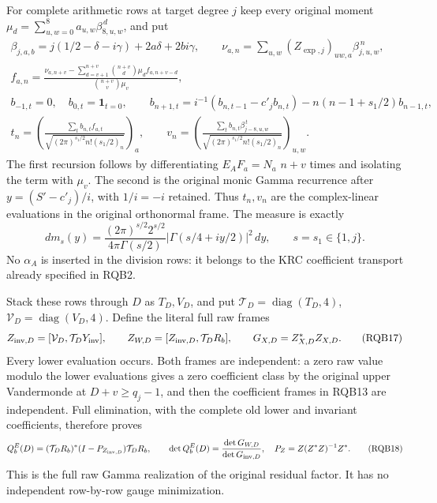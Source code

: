 \documentclass[11pt,a4paper]{article}
\begin{document}
For complete arithmetic rows at target degree $j$ keep every original
moment $\mu_d=\sum_{u,w=0}^8a_{u,w}\beta_{8,u,w}^{\,d}$, and put
\[
\begin{gathered}
 \beta_{j,a,b}=j(1/2-\delta-i\gamma)+2a\delta+2bi\gamma,\qquad
 \nu_{a,n}=\sum_{u,w}(Z_{\exp,j})_{uw,a}\beta_{j,u,w}^{\,n},\\
 f_{a,n}=
 \frac{\nu_{a,n+v}-\sum_{d=v+1}^{n+v}\binom{n+v}{d}
                       \mu_d f_{a,n+v-d}}
      {\binom{n+v}{v}\mu_v},\\
 b_{-1,t}=0,\quad b_{0,t}=\mathbf1_{t=0},\qquad
 b_{n+1,t}=i^{-1}(b_{n,t-1}-c'_j b_{n,t})
                  -n(n-1+s_1/2)b_{n-1,t},\\
 t_n=\left(\frac{\sum_t b_{n,t}f_{a,t}}
                 {\sqrt{(2\pi)^{s_1/2}n!(s_1/2)_n}}\right)_a,
 \qquad
 v_n=\left(\frac{\sum_t b_{n,t}\beta_{j-8,u,w}^{\,t}}
                 {\sqrt{(2\pi)^{s_1/2}n!(s_1/2)_n}}\right)_{u,w}.
\end{gathered}\tag{RQB16}
\]
The first recursion follows by differentiating $E_AF_a=N_a$
$n+v$ times and isolating the term with $\mu_v$.
The second is the original monic Gamma recurrence after
$y=(S'-c'_j)/i$, with $1/i=-i$ retained. Thus $t_n,v_n$ are the
complex-linear evaluations in the original orthonormal frame.
The measure is exactly
\[
 dm_s(y)=\frac{(2\pi)^{s/2}2^{s/2}}{4\pi\Gamma(s/2)}
                |\Gamma(s/4+iy/2)|^2\,dy ,
 \qquad s=s_1\in\{1,j\}.
\]
No $\alpha_A$ is inserted in the division rows: it belongs to
the KRC coefficient transport already specified in RQB2.

Stack these rows through $D$ as $T_D,V_D$, and put
$\mathcal T_D=\operatorname{diag}(T_D,4)$,
$\mathcal V_D=\operatorname{diag}(V_D,4)$. Define the literal
full raw frames
\[
 Z_{{\rm inv},D}=[\mathcal V_D,\mathcal T_DY_{\rm inv}],
 \qquad
 Z_{W,D}=[Z_{{\rm inv},D},\mathcal T_DR_b],
 \qquad G_{X,D}=Z_{X,D}^*Z_{X,D}.
 \tag{RQB17}
\]
Every lower evaluation occurs. Both frames are independent:
a zero raw value modulo the lower evaluations gives a zero
coefficient class by the original upper Vandermonde at
$D+v\ge q_j-1$, and then the coefficient frames in RQB13
are independent. Full elimination, with the complete old
lower and invariant coefficients, therefore proves
\[
 Q_b^E(D)=(\mathcal T_DR_b)^*
                 (I-P_{Z_{{\rm inv},D}})\mathcal T_DR_b,
 \qquad
 \det Q_b^E(D)=\frac{\det G_{W,D}}{\det G_{{\rm inv},D}},
 \quad P_Z=Z(Z^*Z)^{-1}Z^* .
 \tag{RQB18}
\]
This is the full raw Gamma realization of the original residual
factor. It has no independent row-by-row gauge minimization.
\end{document}
